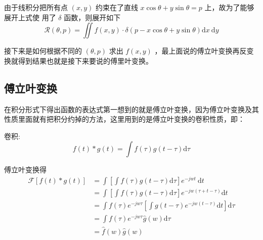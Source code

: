 \documentclass[hyperref]{ctexart}
\begin{document}
			由于线积分把所有点 $(x, y)$ 约束在了直线 $x \cos \theta+y \sin \theta=p$ 上，故为了能够展开上式使 用了 $\delta$ 函数，则展开如下
			\begin{equation}
				\mathcal{R}(\theta, p)=\iint f(x, y) \cdot \delta(p-x \cos \theta+y \sin \theta) \mathrm{d}x \mathrm{~d}y
			\end{equation}

			接下来是如何根据不同的 $(\theta, p)$ 求出 $f(x, y)$ ，最上面说的傅立叶变换再反变换就得到结果也就是接下来要说的傅里叶变换。

		\subsection{傅立叶变换 }
			在积分形式下得出函数的表达式第一想到的就是傅立叶变换，因为傅立叶变换及其性质里面就有把积分约掉的方法，这里用到的是傅立叶变换的卷积性质，即：

			卷积:
			\begin{equation}
			f(t) * g(t)=\int f(\tau) g(t-\tau) \mathrm{d} \tau
			\end{equation}
			
			傅立叶变换得
			\begin{equation}
				\begin{aligned}
				\mathcal{F}[f(t) * g(t)] &=\int\left[\int f(\tau) g(t-\tau) \mathrm{d} \tau\right] e^{-j w t} \mathrm{~d} t \\
				&=\int\left[\int f(\tau) g(t-\tau) \mathrm{d} \tau\right] e^{-j w(\tau+t-\tau)} \mathrm{d} t \\
				&=\int f(\tau) e^{-j w \tau}\left[\int g(t-\tau) e^{-j w(t-\tau)} \mathrm{d} t\right] \mathrm{d} \tau \\
				&=\int f(\tau) e^{-j w \tau} \hat{g}(w) \mathrm{d} \tau \\
				&=\hat{f}(w) \hat{g}(w)
				\end{aligned}
			\end{equation}	
\end{document}
